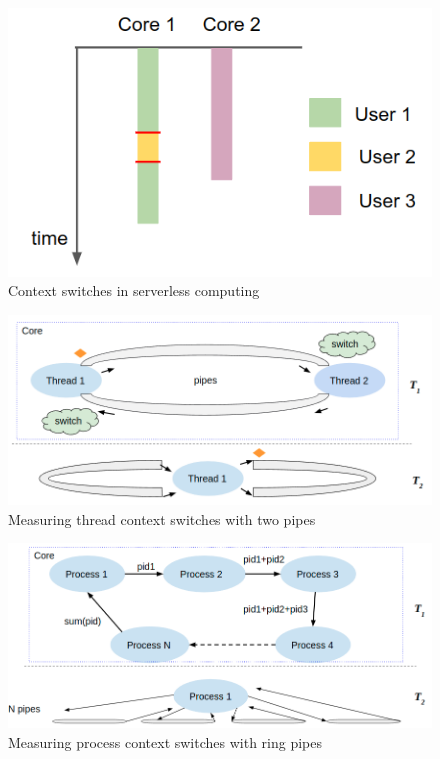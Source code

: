 \begin{figure}
	\centering
	\includegraphics[width=\linewidth]{./figure/cxt_cloud.png}
	\caption{Context switches in serverless computing}
	\label{fig:cloud}
\end{figure}

\begin{figure}
	\centering
	\includegraphics[width=\linewidth]{./figure/pipes.png}
	\caption{Measuring thread context switches with two pipes}
	\label{fig:pipes}
\end{figure}

\begin{figure}
	\centering
	\includegraphics[width=\linewidth]{./figure/ring.png}
	\caption{Measuring process context switches with ring pipes}
	\label{fig:ring}
\end{figure}

